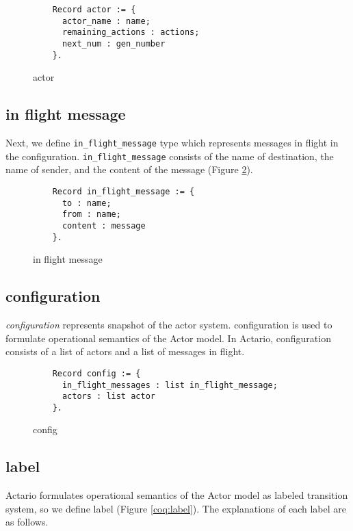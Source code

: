 \begin{figure}[t]
  \begin{lstlisting}
    Record actor := {
      actor_name : name;
      remaining_actions : actions;
      next_num : gen_number
    }.
  \end{lstlisting}
  \caption{actor}\label{coq:actor}
\end{figure}

\subsection{in flight message}
Next, we define \lstinline|in_flight_message| type which represents messages in flight in the configuration.
\lstinline|in_flight_message| consists of the name of destination, the name of sender, and the content of the message (Figure \ref{coq:inflight}).

\begin{figure}[t]
  \begin{lstlisting}
    Record in_flight_message := {
      to : name;
      from : name;
      content : message
    }.
  \end{lstlisting}
  \caption{in flight message}\label{coq:inflight}
\end{figure}

\subsection{configuration}
\textit{configuration} represents snapshot of the actor system.
configuration is used to formulate operational semantics of the Actor model.
In Actario, configuration consists of a list of actors and a list of messages in flight.

\begin{figure}[t]
  \begin{lstlisting}
    Record config := {
      in_flight_messages : list in_flight_message;
      actors : list actor
    }.
  \end{lstlisting}
  \caption{config}\label{coq:config}
\end{figure}


\subsection{label}
Actario formulates operational semantics of the Actor model as labeled transition system, so we define label (Figure \ref{coq:label}).
The explanations of each label are as follows.


